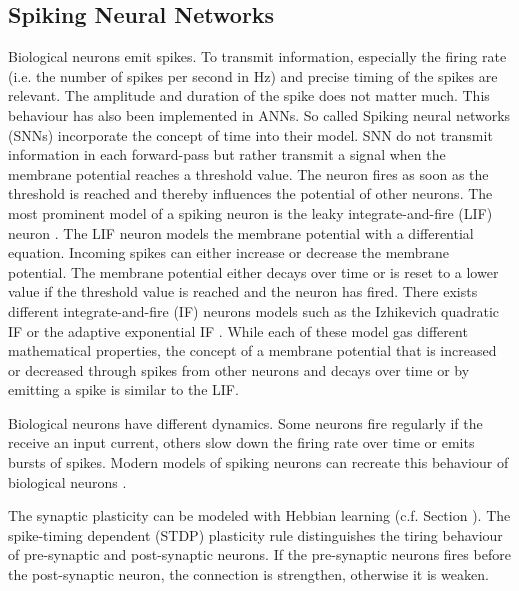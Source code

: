 \subsection{Spiking Neural Networks}
Biological neurons emit spikes.
To transmit information, especially the firing rate (i.e. the number of spikes per second in Hz) and precise timing of the spikes are relevant.
The amplitude and duration of the spike does not matter much.
This behaviour has also been implemented in ANNs.
So called Spiking neural networks (SNNs) incorporate the concept of time into their model.
SNN do not transmit information in each forward-pass but rather transmit a signal when the membrane potential reaches a threshold value. 
The neuron fires as soon as the threshold is reached and thereby influences the potential of other neurons.
The most prominent model of a spiking neuron is the leaky integrate-and-fire (LIF) neuron .
The LIF neuron models the membrane potential with a differential equation.
Incoming spikes can either increase or decrease the membrane potential.
The membrane potential either decays over time or is reset to a lower value if the threshold value is reached and the neuron has fired.
There exists different integrate-and-fire (IF) neurons models such as the Izhikevich quadratic IF  or the adaptive exponential IF .
While each of these model gas different mathematical properties, the concept of a membrane potential that is increased or decreased through spikes from other neurons and decays over time or by emitting a spike is similar to the LIF.

Biological neurons have different dynamics.
Some neurons fire regularly if the receive an input current, others slow down the firing rate over time or emits bursts of spikes.
Modern models of spiking neurons can recreate this behaviour of biological neurons .

The synaptic plasticity can be modeled with Hebbian learning (c.f. Section ).
The spike-timing dependent (STDP) plasticity rule  distinguishes the tiring behaviour of pre-synaptic and post-synaptic neurons.
If the pre-synaptic neurons fires before the post-synaptic neuron, the connection is strengthen, otherwise it is weaken.

